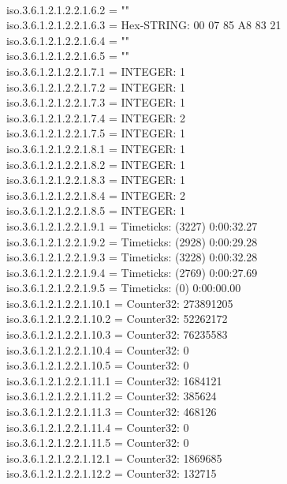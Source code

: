 \documentclass[a4paper,titlepage]{article}
\begin{document}
\begin{center}
{\\iso.3.6.1.2.1.2.2.1.6.2 = ""
\\iso.3.6.1.2.1.2.2.1.6.3 = Hex-STRING: 00 07 85 A8 83 21 
\\iso.3.6.1.2.1.2.2.1.6.4 = ""
\\iso.3.6.1.2.1.2.2.1.6.5 = ""
\\iso.3.6.1.2.1.2.2.1.7.1 = INTEGER: 1
\\iso.3.6.1.2.1.2.2.1.7.2 = INTEGER: 1
\\iso.3.6.1.2.1.2.2.1.7.3 = INTEGER: 1
\\iso.3.6.1.2.1.2.2.1.7.4 = INTEGER: 2
\\iso.3.6.1.2.1.2.2.1.7.5 = INTEGER: 1
\\iso.3.6.1.2.1.2.2.1.8.1 = INTEGER: 1
\\iso.3.6.1.2.1.2.2.1.8.2 = INTEGER: 1
\\iso.3.6.1.2.1.2.2.1.8.3 = INTEGER: 1
\\iso.3.6.1.2.1.2.2.1.8.4 = INTEGER: 2
\\iso.3.6.1.2.1.2.2.1.8.5 = INTEGER: 1
\\iso.3.6.1.2.1.2.2.1.9.1 = Timeticks: (3227) 0:00:32.27
\\iso.3.6.1.2.1.2.2.1.9.2 = Timeticks: (2928) 0:00:29.28
\\iso.3.6.1.2.1.2.2.1.9.3 = Timeticks: (3228) 0:00:32.28
\\iso.3.6.1.2.1.2.2.1.9.4 = Timeticks: (2769) 0:00:27.69
\\iso.3.6.1.2.1.2.2.1.9.5 = Timeticks: (0) 0:00:00.00
\\iso.3.6.1.2.1.2.2.1.10.1 = Counter32: 273891205
\\iso.3.6.1.2.1.2.2.1.10.2 = Counter32: 52262172
\\iso.3.6.1.2.1.2.2.1.10.3 = Counter32: 76235583
\\iso.3.6.1.2.1.2.2.1.10.4 = Counter32: 0
\\iso.3.6.1.2.1.2.2.1.10.5 = Counter32: 0
\\iso.3.6.1.2.1.2.2.1.11.1 = Counter32: 1684121
\\iso.3.6.1.2.1.2.2.1.11.2 = Counter32: 385624
\\iso.3.6.1.2.1.2.2.1.11.3 = Counter32: 468126
\\iso.3.6.1.2.1.2.2.1.11.4 = Counter32: 0
\\iso.3.6.1.2.1.2.2.1.11.5 = Counter32: 0
\\iso.3.6.1.2.1.2.2.1.12.1 = Counter32: 1869685
\\iso.3.6.1.2.1.2.2.1.12.2 = Counter32: 132715
}
\end{center}
\end{document}
